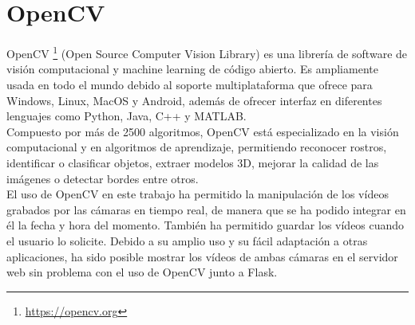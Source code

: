 \section{OpenCV}
\label{sec:opencv}
OpenCV \footnote{\url{https://opencv.org}} (Open Source Computer Vision Library) es una librería de software de visión computacional y machine learning de código abierto. Es ampliamente usada en todo el mundo debido al soporte multiplataforma que ofrece para Windows, Linux, MacOS y Android, además de ofrecer interfaz en diferentes lenguajes como Python, Java, C++ y MATLAB.\\
Compuesto por más de 2500 algoritmos, OpenCV está especializado en la visión computacional y en algoritmos de aprendizaje, permitiendo reconocer rostros, identificar o clasificar objetos, extraer modelos 3D, mejorar la calidad de las imágenes o detectar bordes entre otros.\\
El uso de OpenCV en este trabajo ha permitido la manipulación de los vídeos grabados por las cámaras en tiempo real, de manera que se ha podido integrar en él la fecha y hora del momento. También ha permitido guardar los vídeos cuando el usuario lo solicite. Debido a su amplio uso y su fácil adaptación a otras aplicaciones, ha sido posible mostrar los vídeos de ambas cámaras en el servidor web sin problema con el uso de OpenCV junto a Flask.\\
